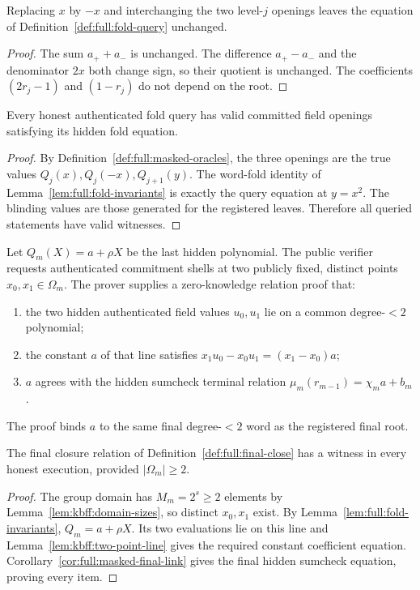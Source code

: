\begin{lemma}\label{lem:full:fold-query-choice}
Replacing $x$ by $-x$ and
interchanging the two level-$j$
openings leaves the equation
of Definition~\ref{def:full:fold-query}
unchanged.
\end{lemma}
\begin{proof}
The sum $a_++a_-$ is unchanged.
The difference $a_+-a_-$ and
the denominator $2x$ both
change sign, so their quotient
is unchanged. The coefficients
$(2r_j-1)$ and $(1-r_j)$
do not depend on the root.
\end{proof}

\begin{lemma}\label{lem:full:fold-query-complete}
Every honest authenticated fold query
has valid committed field openings
satisfying its hidden fold equation.
\end{lemma}
\begin{proof}
By Definition~\ref{def:full:masked-oracles},
the three openings are the
true values
$Q_j(x),Q_j(-x),Q_{j+1}(y)$.
The word-fold identity of
Lemma~\ref{lem:full:fold-invariants}
is exactly the query equation
at $y=x^2$. The blinding
values are those generated
for the registered leaves.
Therefore all queried statements
have valid witnesses.
\end{proof}

\begin{definition}\label{def:full:final-close}
Let $Q_m(X)=a+\rho X$ be the
last hidden polynomial.
The public verifier requests
authenticated commitment shells
at two publicly fixed, distinct
points $x_0,x_1\in\Omega_m$.
The prover supplies a zero-knowledge
relation proof that:
\begin{enumerate}[label=\textup{(\roman*)}]
\item the two hidden authenticated
field values $u_0,u_1$ lie on
a common degree-$<2$ polynomial;
\item the constant $a$ of that
line satisfies
$x_1u_0-x_0u_1=(x_1-x_0)a$;
\item $a$ agrees with the hidden
sumcheck terminal relation
$\mu_m(r_{m-1})=\chi_m a+b_m$.
\end{enumerate}
The proof binds $a$ to the
same final degree-$<2$ word
as the registered final root.
\end{definition}

\begin{lemma}\label{lem:full:final-complete}
The final closure relation of
Definition~\ref{def:full:final-close}
has a witness in every honest
execution, provided $|\Omega_m|\ge2$.
\end{lemma}
\begin{proof}
The group domain has
$M_m=2^s\ge2$ elements by
Lemma~\ref{lem:kbff:domain-sizes},
so distinct $x_0,x_1$ exist.
By Lemma~\ref{lem:full:fold-invariants},
$Q_m=a+\rho X$. Its two
evaluations lie on this line
and Lemma~\ref{lem:kbff:two-point-line}
gives the required constant
coefficient equation.
Corollary~\ref{cor:full:masked-final-link}
gives the final hidden sumcheck
equation, proving every item.
\end{proof}

